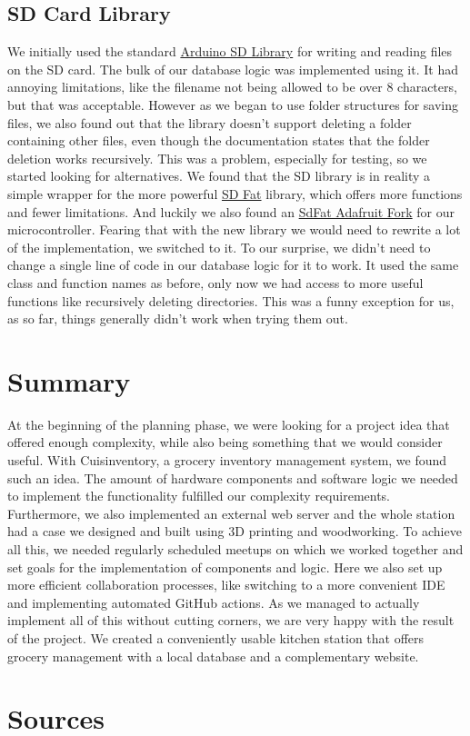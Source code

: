 \documentclass{article}
\begin{document}
\subsection{SD Card Library}
We initially used the standard \href{https://github.com/arduino-libraries/SD}{Arduino SD Library} for writing and reading files on the SD card. The bulk of our database logic was implemented using it.
It had annoying limitations, like the filename not being allowed to be over 8 characters, but that was acceptable.
However as we began to use folder structures for saving files, we also found out that the library doesn't support deleting a folder containing other files, even though the documentation states that the folder deletion works recursively.
This was a problem, especially for testing, so we started looking for alternatives. We found that the SD library is in reality a simple wrapper for the more powerful \href{https://github.com/greiman/SdFat}{SD Fat} library, which offers more functions and fewer limitations.
And luckily we also found an \href{https://github.com/adafruit/SdFat}{SdFat Adafruit Fork} for our microcontroller. Fearing that with the new library we would need to rewrite a lot of the implementation, we switched to it.
To our surprise, we didn't need to change a single line of code in our database logic for it to work. It used the same class and function names as before, only now we had access to more useful functions like recursively deleting directories.
This was a funny exception for us, as so far, things generally didn't work when trying them out.
\section{Summary}
At the beginning of the planning phase, we were looking for a project idea that offered enough complexity, while also being something that we would consider useful.
With Cuisinventory, a grocery inventory management system, we found such an idea. The amount of hardware components and software logic we needed to implement the functionality fulfilled our complexity requirements.
Furthermore, we also implemented an external web server and the whole station had a case we designed and built using 3D printing and woodworking.
To achieve all this, we needed regularly scheduled meetups on which we worked together and set goals for the implementation of components and logic.
Here we also set up more efficient collaboration processes, like switching to a more convenient IDE and implementing automated GitHub actions.
As we managed to actually implement all of this without cutting corners, we are very happy with the result of the project.
We created a conveniently usable kitchen station that offers grocery management with a local database and a complementary website.


\section{Sources}
\end{document}
